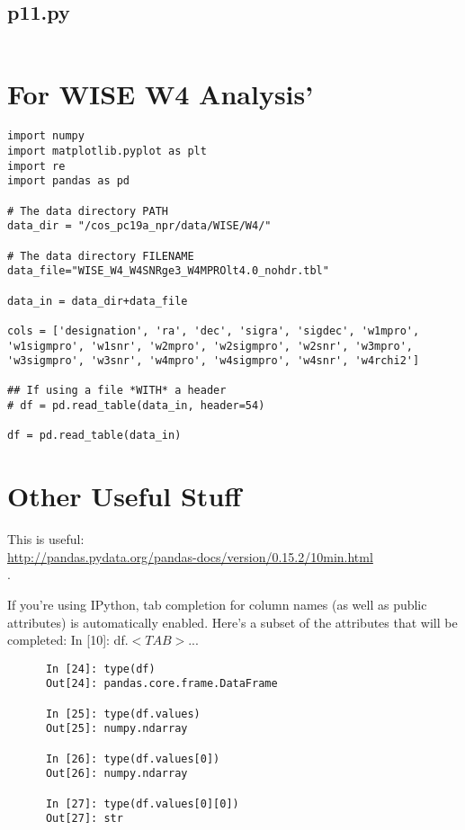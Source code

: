 \documentclass[11pt,a4paper]{article}
\begin{document}
\subsection{p11.py} 
\smallskip
\smallskip
\noindent 
\begin{lstlisting}

\end{lstlisting}
\clearpage


\section{For WISE W4 Analysis'}
\smallskip
\smallskip
\noindent 
\begin{lstlisting}
import numpy
import matplotlib.pyplot as plt
import re
import pandas as pd 

# The data directory PATH
data_dir = "/cos_pc19a_npr/data/WISE/W4/"

# The data directory FILENAME
data_file="WISE_W4_W4SNRge3_W4MPROlt4.0_nohdr.tbl"

data_in = data_dir+data_file

cols = ['designation', 'ra', 'dec', 'sigra', 'sigdec', 'w1mpro', 'w1sigmpro', 'w1snr', 'w2mpro', 'w2sigmpro', 'w2snr', 'w3mpro', 'w3sigmpro', 'w3snr', 'w4mpro', 'w4sigmpro', 'w4snr', 'w4rchi2']

## If using a file *WITH* a header
# df = pd.read_table(data_in, header=54) 

df = pd.read_table(data_in) 
\end{lstlisting}




\newpage
\section{Other Useful Stuff}
    \smallskip
    \smallskip
    \noindent 
    This is useful: \\
    \href{http://pandas.pydata.org/pandas-docs/version/0.15.2/10min.html}{http://pandas.pydata.org/pandas-docs/version/0.15.2/10min.html}\\.
    
    \smallskip
    \smallskip
    \noindent 
    If you’re using IPython, tab completion for column names (as well as
    public attributes) is automatically enabled. Here’s a subset of the
    attributes that will be completed:
    In [10]: df.$<TAB>$...
    
    \begin{lstlisting}
      In [24]: type(df)
      Out[24]: pandas.core.frame.DataFrame
      
      In [25]: type(df.values)
      Out[25]: numpy.ndarray
      
      In [26]: type(df.values[0])
      Out[26]: numpy.ndarray
      
      In [27]: type(df.values[0][0])
      Out[27]: str
    \end{lstlisting}
\end{document}
